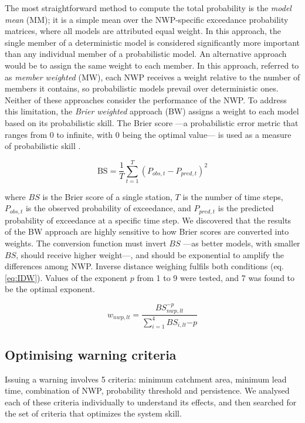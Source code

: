 \documentclass{ametsocV6.1}
\begin{document}
The most straightforward method to compute the total probability is the \textit{model mean} (MM); it is a simple mean over the NWP-specific exceedance probability matrices, where all models are attributed equal weight. In this approach, the single member of a deterministic model is considered significantly more important than any individual member of a probabilistic model. An alternative approach would be to assign the same weight to each member. In this approach, referred to as \textit{member weighted} (MW), each NWP receives a weight relative to the number of members it contains, so probabilistic models prevail over deterministic ones. Neither of these approaches consider the performance of the NWP. To address this limitation, the \textit{Brier weighted} approach (BW) assigns a weight to each model based on its probabilistic skill. The Brier score  —a probabilistic error metric that ranges from 0 to infinite, with 0 being the optimal value— is used as a measure of probabilistic skill \citep{Brier1950}.

\begin{equation}
    \label{eq:BS}
    \text{BS} = \frac{1}{T}\sum_{t=1}^{T} \left( P_{obs,t} - P_{pred,t} \right)^2
\end{equation}

where $BS$  is the Brier score of a single station, $T$  is the number of time steps, $P_{obs,t}$ is the observed probability of exceedance, and $P_{pred,t}$  is the predicted probability of exceedance at a specific time step. We discovered that the results of the BW approach are highly sensitive to how Brier scores are converted into weights. The conversion function must invert $BS$ —as better models, with smaller $BS$, should receive higher weight—, and should be exponential to amplify the differences among NWP. Inverse distance weighing fulfils both conditions (eq. \ref{eq:IDW}). Values of the exponent $p$ from 1 to 9 were tested, and 7 was found to be the optimal exponent.

\begin{equation}
    \label{eq:IDW}
    w_{nwp,lt} = \frac{BS_{nwp,lt}^{-p}}{\sum_{i=1}^{4} BS_{i,lt}{-p}}
\end{equation}

\subsection{Optimising warning criteria}
\label{sec:methods_OPT}

Issuing a warning involves 5 criteria: minimum catchment area, minimum lead time, combination of NWP, probability threshold and persistence. We analysed each of these criteria individually to understand its effects, and then searched for the set of criteria that optimizes the system skill.
\end{document}
